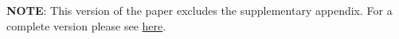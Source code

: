 
\textbf{NOTE}: This version of the paper excludes the supplementary appendix. For a complete version please see \href{https://thevoice.bse.eu/wp-content/uploads/2021/07/ds21-project-agusti-et-al.pdf}{here}.